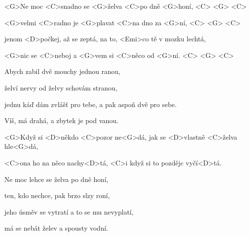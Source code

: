 

\zs
<G>Ne moc <C>snadno se <G>želva <C>po dně <G>honí, <C> <G> <C>

<G>velmi <C>radno je <G>plavat <C>na dno za <G>ní, <C> <G> <C>

jenom <D>počkej, až se zeptá, na to, <Emi>co tě v mozku lechtá,

<G>nic se <C>neboj a <G>vem si <C>něco od <G>ní. <C> <G> <C>
\ks

\zs
Abych zabil dvě mouchy jednou ranou,

želví nervy od želvy schovám stranou,

jednu káď dám zvlášť pro tebe, a pak aspoň dvě pro sebe.

Víš, má drahá, a zbytek je pod vanou.
\ks

\zr
<G>Když si <D>někdo <C>pozor ne<G>dá, jak se <D>vlastně <C>želva hle<G>dá,

<C>ona ho na něco nachy<D>tá, <C>i když si to pozdějc 
vyčí<D>tá.
\kr

\zs
Ne moc lehce se želva po dně honí,

ten, kdo nechce, pak brzo slzy roní,

jeho úsměv se vytratí a to se mu nevyplatí,

má se nebát želev a spousty vodní.
\ks

\zr \kr

\kp
